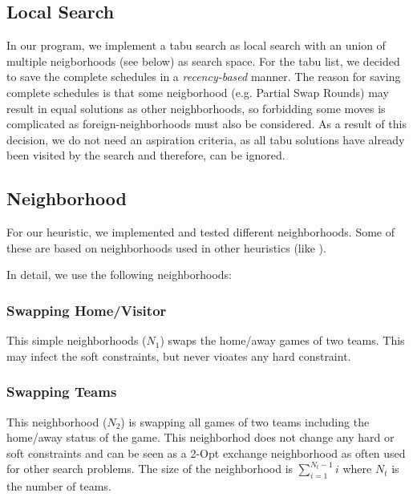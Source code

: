 \documentclass[a4paper,11pt]{article}
\begin{document}
\subsection{Local Search}
In our program, we implement a tabu search as local search with an union of multiple neigborhoods (see below) as search space.
For the tabu list, we decided to save the complete schedules in a \emph{recency-based} manner. The reason for saving complete schedules is that some neigborhood 
(e.g. Partial Swap Rounds) may result in equal solutions as other neighborhoods, so forbidding some moves is complicated as foreign-neighborhoods must also be considered.
As a result of this decision, we do not need an aspiration criteria, as all tabu solutions have already been visited by the search and therefore, can be ignored.

\subsection{Neighborhood}
For our heuristic, we implemented and tested different neighborhoods. Some of these are based on neighborhoods used in other heuristics (like \cite{Gaspero07,rvk2008, Anagnostopoulos06}).

In detail, we use the following neighborhoods:
\subsubsection{Swapping Home/Visitor}
This simple neighborhoods ($N_1$) swaps the home/away games of two teams. This may infect the soft constraints, but never vioates any hard constraint.

\subsubsection{Swapping Teams}
This neighborhood ($N_2$) is swapping all games of two teams including the home/away status of the game. This neighborhod does not change any hard or soft constraints and 
can be seen as a 2-Opt exchange neighborhood as often used for other search problems. The size of the neighborhood is $\sum_{i=1}^{N_t-1}i$ where $N_t$ is the number of teams.
\end{document}
